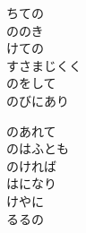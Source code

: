\documentclass[10pt,b5j]{tarticle} %
\begin{document}
\begin{enumerate}
\begin{minipage}[c]{\blocksize}
        \vspace{\linespace}
        \item
        ちての\\
        ののき\\
        けての\\
        すさまじくく\\
        のをして\\
        のびにあり
        
        \vspace{\linespace}
        \item
        のあれて\\
        のはふとも\\
        のければ\\
        はになり\\
        けやに\\
        るるの
    
    \end{minipage}
\end{enumerate} %
\end{document}
